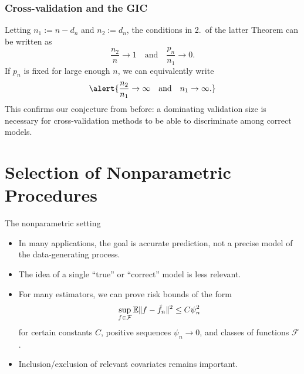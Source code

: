 \documentclass{beamer}
\newcommand{\0}{\emptyset}
\newcommand{\E}{\mathbb{E}}
\newcommand{\norm}[1]{|\hspace{-1pt}|#1 |\hspace{-1pt}|}
\newcommand{\normsq}[1]{\norm{#1}^{2}}
\newcommand{\Fcal}{\mathcal{F}}
\newcommand{\1}{\mathmybb{1}}
\begin{document}
\begin{frame}
  \frametitle{Cross-validation and the GIC}
  Letting \(n_{1}:=n-d_{n}\)  and \(n_{2}:=d_{n}\), the conditions in 2.\ of the latter Theorem can be written as 
\[\frac{n_{2}}{n}\to 1\quad\text{and}\quad \frac{p_{n}}{n_{1}}\to 0.\]
If \(p_{n}\) is fixed for large enough \(n\), we can equivalently write
\begin{equation}\label{eq:lmsplitcond}
    \alert{\frac{n_{2}}{n_{1}}\to\infty\quad\text{and}\quad n_{1}\to \infty.}
\end{equation}
This confirms our conjecture from before: a dominating validation size is necessary for cross-validation methods to be able to discriminate among correct models.
\end{frame}

\section{Selection of Nonparametric Procedures}\label{sec:yang}
\begin{frame}{The nonparametric setting}
  \begin{itemize}
    \item In many applications, the goal is accurate prediction, not a precise model of the data-generating process.

    \item The idea of a single “true” or “correct” model is less relevant.
    
    \item For many estimators, we can prove risk bounds of the form
    \[\sup_{f\in\Fcal}\E{\normsq{f - \hat{f}_{n}}} \leq C\psi_{n}^{2}\]
    for certain constants \(C\), positive sequences \(\psi_{n}\to 0\), and classes of functions \(\Fcal\).

    \item Inclusion/exclusion of relevant covariates remains important.
  \end{itemize}
\end{frame}
\end{document}
